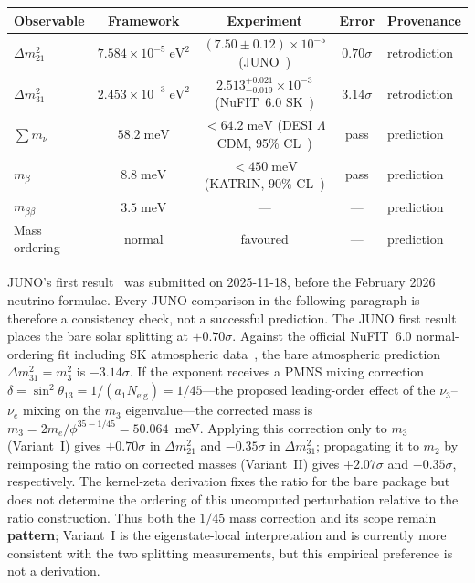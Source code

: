 \documentclass[12pt,a4paper]{article}
\theoremstyle{definition}
\begin{document}
\begin{center}
\begin{tabular}{lcccl}
\toprule
\textbf{Observable} & \textbf{Framework} & \textbf{Experiment} & \textbf{Error} & \textbf{Provenance} \\
\midrule
$\Delta m^2_{21}$ & $7.584 \times 10^{-5}\;\text{eV}^2$ & $(7.50 \pm 0.12)\times 10^{-5}$ (JUNO~\cite{juno2025}) & $0.70\sigma$ & retrodiction \\
$\Delta m^2_{31}$ & $2.453 \times 10^{-3}\;\text{eV}^2$ & $2.513^{+0.021}_{-0.019}\times 10^{-3}$ (NuFIT~6.0 SK~\cite{nufit6}) & $3.14\sigma$ & retrodiction \\
$\sum m_\nu$ & $58.2\;\text{meV}$ & $< 64.2\;\text{meV}$ (DESI $\Lambda$CDM, 95\% CL~\cite{desinu2025}) & pass & prediction \\
$m_\beta$ & $8.8\;\text{meV}$ & $< 450\;\text{meV}$ (KATRIN, 90\% CL~\cite{katrin2025}) & pass & prediction \\
$m_{\beta\beta}$ & $3.5\;\text{meV}$ & --- & --- & prediction \\
Mass ordering & normal & favoured & --- & prediction \\
\bottomrule
\end{tabular}
\end{center}
JUNO's first result~\cite{juno2025} was submitted on 2025-11-18, before the
February 2026 neutrino formulae.  Every JUNO comparison in the following
paragraph is therefore a consistency check, not a successful prediction.
The JUNO first result~\cite{juno2025} places the bare solar splitting at $+0.70\sigma$.  Against the official NuFIT~6.0 normal-ordering fit including SK atmospheric data~\cite{nufit6}, the bare atmospheric prediction $\Delta m^2_{31}=m_3^2$ is $-3.14\sigma$.  If the exponent receives a PMNS mixing correction $\delta = \sin^2\theta_{13} = 1/(a_1 N_{\text{eig}}) = 1/45$---the proposed leading-order effect of the $\nu_3$--$\nu_e$ mixing on the $m_3$ eigenvalue---the corrected mass is $m_3 = 2m_e/\phi^{35 - 1/45} = 50.064$~meV.  Applying this correction only to $m_3$ (Variant~I) gives $+0.70\sigma$ in $\Delta m^2_{21}$ and $-0.35\sigma$ in $\Delta m^2_{31}$; propagating it to $m_2$ by reimposing the ratio on corrected masses (Variant~II) gives $+2.07\sigma$ and $-0.35\sigma$, respectively.  The kernel-zeta derivation fixes the ratio for the bare package but does not determine the ordering of this uncomputed perturbation relative to the ratio construction.  Thus both the $1/45$ mass correction and its scope remain \textbf{pattern}; Variant~I is the eigenstate-local interpretation and is currently more consistent with the two splitting measurements, but this empirical preference is not a derivation.
\end{document}
